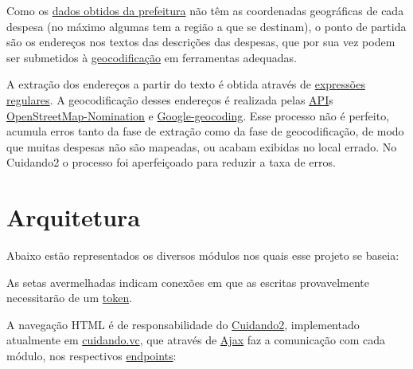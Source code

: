\documentclass[letterpaper,10pt,english]{sphinxmanual}
\begin{document}
Como os \href{http://orcamento.prefeitura.sp.gov.br/orcamento/execucao.html}{dados obtidos da
prefeitura}
não têm as coordenadas geográficas de cada despesa (no máximo algumas
tem a região a que se destinam), o ponto de partida são os endereços nos
textos das descrições das despesas, que por sua vez podem ser submetidos
à \href{https://en.wikipedia.org/wiki/Geocoding}{geocodificação} em
ferramentas adequadas.

A extração dos endereços a partir do texto é obtida através de \href{https://pt.wikipedia.org/wiki/Express\%C3\%A3o\_regular}{expressões regulares}. A geocodificação desses endereços é realizada pelas \href{https://en.wikipedia.org/wiki/Application\_programming\_interface}{API}s
\href{http://wiki.openstreetmap.org/wiki/Nominatim}{OpenStreetMap-Nomination}
e \href{https://developers.google.com/maps/documentation/geocoding/intro}{Google-geocoding}.
Esse processo não é perfeito, acumula erros tanto da fase de extração
como da fase de geocodificação, de modo que muitas despesas não são
mapeadas, ou acabam exibidas no local errado. No Cuidando2 o processo
foi aperfeiçoado para reduzir a taxa de erros.


\chapter{Arquitetura}
\label{index:arquitetura}
Abaixo estão representados os diversos módulos nos quais esse projeto se
baseia:



As setas avermelhadas indicam conexões em que as escritas provavelmente
necessitarão de um
\href{https://github.com/okfn-brasil/viralata\#protocol}{token}.

A navegação HTML é de responsabilidade do \href{https://github.com/okfn-brasil/cuidando2}{Cuidando2}, implementado
atualmente em \href{https://cuidando.vc}{cuidando.vc}, que através de
\href{https://en.wikipedia.org/wiki/Ajax\_(programming)}{Ajax} faz a
comunicação com cada módulo, nos respectivos
\href{http://www.w3.org/TR/wsdl20/\#Endpoint}{endpoints}:
\end{document}

